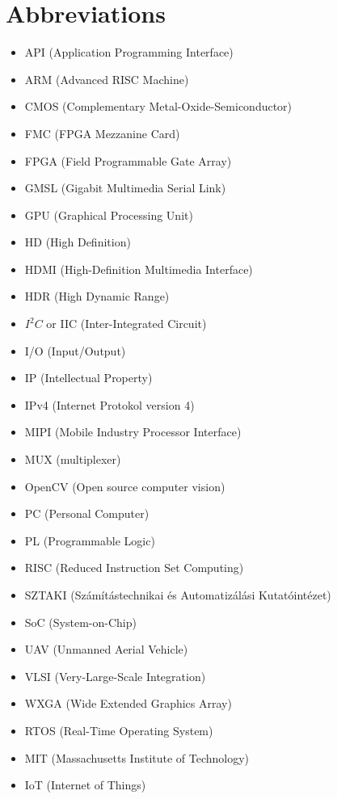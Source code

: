 \chapter{Abbreviations}
\begin{multicols}{2}

\begin{itemize}
    \item API (Application Programming Interface)
    \item ARM (Advanced RISC Machine)
    \item CMOS (Complementary Metal-Oxide-Semiconductor)
    \item FMC (FPGA Mezzanine Card)
    \item FPGA (Field Programmable Gate Array)
    \item GMSL (Gigabit Multimedia Serial Link)
    \item GPU (Graphical Processing Unit)
    \item HD (High Definition)
    \item HDMI (High-Definition Multimedia Interface)
    \item HDR (High Dynamic Range)
    \item $I^2C$ or IIC (Inter-Integrated Circuit)
    \item I/O (Input/Output)
    \item IP (Intellectual Property)
    \item IPv4 (Internet Protokol version 4)
    \item MIPI (Mobile Industry Processor Interface)
    \item MUX (multiplexer)
    \item OpenCV (Open source computer vision)
    \item PC (Personal Computer)
    \item PL (Programmable Logic)
    \item RISC (Reduced Instruction Set Computing)
    \item SZTAKI (Számítástechnikai és Automatizálási Kutatóintézet)
    \item SoC (System-on-Chip)
    \item UAV (Unmanned Aerial Vehicle)
    \item VLSI (Very-Large-Scale Integration)
    \item WXGA (Wide Extended Graphics Array)
    \item RTOS (Real-Time Operating System)
    \item MIT (Massachusetts Institute of Technology)
    \item IoT (Internet of Things)

\end{itemize}
\end{multicols}
